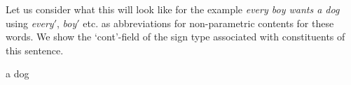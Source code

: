 Let us consider what this will look like for the example \textit{every
  boy wants a dog} using \textit{every}$'$, \textit{boy}$'$ etc. as
abbreviations for non-parametric contents for these words.  We show
the `cont'-field of the sign type associated with constituents of this
sentence.
\begin{ex} 
\begin{subex} 
 
\item a dog 
 
\item
 
\end{subex} 
   
\end{ex} 

